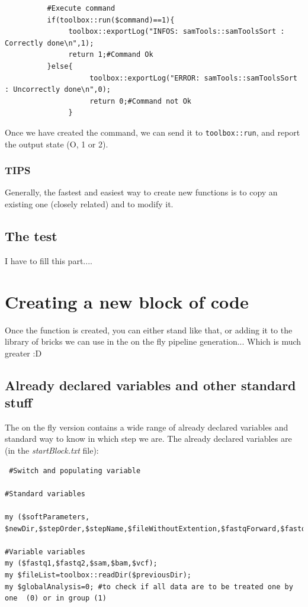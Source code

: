 \documentclass[a4paper,10pt]{report}
\begin{document}
\begin{lstlisting}
          #Execute command
          if(toolbox::run($command)==1){
               toolbox::exportLog("INFOS: samTools::samToolsSort : Correctly done\n",1);
               return 1;#Command Ok
          }else{
                    toolbox::exportLog("ERROR: samTools::samToolsSort : Uncorrectly done\n",0);
                    return 0;#Command not Ok
               }
\end{lstlisting}

Once we have created the command, we can send it to \texttt{toolbox::run}, and report the output state (O, 1 or 2).

\subsection{TIPS}

Generally, the fastest and easiest way to create new functions is to copy an existing one (closely related) and to modify it.



\section{The test}

I have to fill this part....


\chapter{Creating a new block of code}
Once the function is created, you can either stand like that, or adding it to the library of bricks we can use in the on the fly pipeline generation... Which is much greater :D

\section{Already declared variables and other standard stuff}

The on the fly version contains a wide range of already declared variables and standard way to know in which step we are. The already declared variables are (in the \emph{startBlock.txt} file):
\begin{lstlisting}
 #Switch and populating variable

#Standard variables

my ($softParameters, $newDir,$stepOrder,$stepName,$fileWithoutExtention,$fastqForward,$fastqReverse,$samFile,$extension,$samFileOut,$shortDirName,$stepF1,$vcfCalled,$vcfOut,$listOfBam,$bamFile,$bamFileOut,$cleanerCommand,$intervalsFile,$replacementCommand);

#Variable variables
my ($fastq1,$fastq2,$sam,$bam,$vcf);
my $fileList=toolbox::readDir($previousDir);
my $globalAnalysis=0; #to check if all data are to be treated one by one  (0) or in group (1)

\end{lstlisting}
\end{document}
